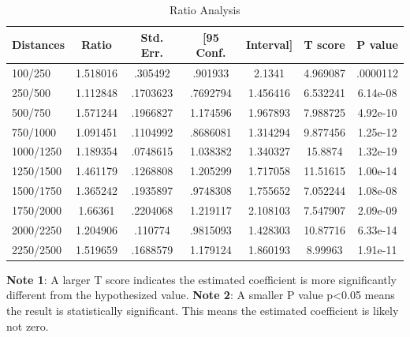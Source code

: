\documentclass[12pt]{article}
\begin{document}
\begin{table}[h]
\centering
\caption{Ratio Analysis}
\begin{tabular}{l||c|c|cc|c|c}
\hline\hline
Distances   &       Ratio&   Std. Err.&  [95 Conf.&   Interval]&     T score&     P value\\
\hline
100/250     &    1.518016&     .305492&     .901933&      2.1341&    4.969087&    .0000112\\
250/500     &    1.112848&    .1703623&    .7692794&    1.456416&    6.532241&    6.14e-08\\
500/750     &    1.571244&    .1966827&    1.174596&    1.967893&    7.988725&    4.92e-10\\
750/1000    &    1.091451&    .1104992&    .8686081&    1.314294&    9.877456&    1.25e-12\\
1000/1250   &    1.189354&    .0748615&    1.038382&    1.340327&     15.8874&    1.32e-19\\
1250/1500   &    1.461179&    .1268808&    1.205299&    1.717058&    11.51615&    1.00e-14\\
1500/1750   &    1.365242&    .1935897&    .9748308&    1.755652&    7.052244&    1.08e-08\\
1750/2000   &     1.66361&    .2204068&    1.219117&    2.108103&    7.547907&    2.09e-09\\
2000/2250   &    1.204906&     .110774&    .9815093&    1.428303&    10.87716&    6.33e-14\\
2250/2500  &    1.519659&    .1688579&    1.179124&    1.860193&     8.99963&    1.91e-11\\
\hline\hline
\end{tabular}
\flushleft
\begin{footnotesize}
\begin{singlespace}
\textbf{Note 1}: A larger T score indicates the estimated coefficient is more significantly different from the hypothesized value.
\textbf{Note 2}: A smaller P value p<0.05 means the result is statistically significant. This means the estimated coefficient is likely not zero.
\end{singlespace}
\end{footnotesize}
\end{table}

\end{document}
